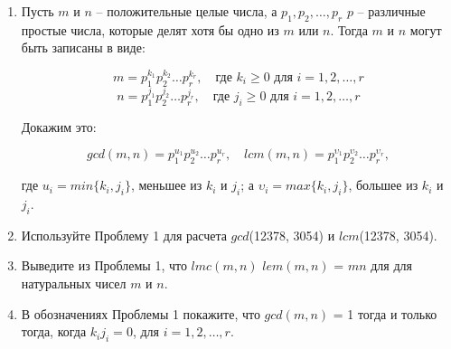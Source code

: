 \documentclass[11pt]{article}
\begin{document}
	\begin{enumerate}
		\item Пусть $m$ и $n$ -- положительные целые числа, а $p_{1},p_{2},\ldots,p_{r}$ $p$ -- различные простые числа, которые делят хотя бы одно из $m$ или $n$. Тогда $m$ и $n$ могут быть записаны в виде:
		
		\[{m = p_{1}^{k_{1}}p_{2}^{k_{2}}\ldots p_{r}^{k_{r}},\quad \text{где } k_{i}\ge0 \text{ для } i = 1,2,\ldots,r}\]
		\[{n = p_{1}^{j_{1}}p_{2}^{j_{2}}\ldots p_{r}^{j_{r}},\quad \text{где } j_{i}\ge0 \text{ для } i = 1,2,\ldots,r}\]
		
		Докажим это:
		
		\setlength{\parskip}{1ex}
		
		\[{gcd (m,n) = p_{1}^{u_{1}}p_{2}^{u_{2}}\ldots p_{r}^{u_{r}},\quad lcm(m,n) = p_{1}^{\upsilon_{1}}p_{2}^{\upsilon_{2}}\ldots p_{r}^{\upsilon_{r}}},\]
		
		\setlength{\parskip}{1ex}
		
		где $u_{i} = min \{k_{i},j_{i}\}$, меньшее из $ k_{i} $ и $ j_{i} $; а $\upsilon_{i} = max \{k_{i},j_{i}\}$, большее из $ k_{i} $ и $ j_{i} $.
		
		
		\item Используйте Проблему 1 для расчета $gcd$(12378, 3054) и $lcm$(12378, 3054).
		
		\item Выведите из Проблемы 1, что $lmc(m, n)$ $lem(m, n)$ = $mn$ для для натуральных чисел $m$ и $n$.
		
		\item В обозначениях Проблемы 1 покажите, что $gcd(m, n)$ = 1 тогда и только тогда, когда $k_{i}j_{i} = 0$, для $i = 1,2,\ldots,r$.
		

\end{enumerate}
\end{document}
